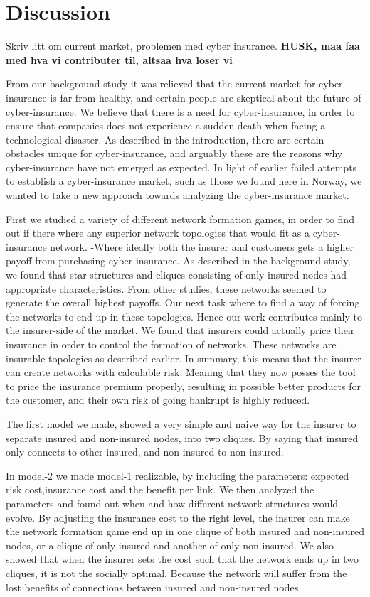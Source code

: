 
\chapter{Discussion}
Skriv litt om current market, problemen med cyber insurance.
\textbf{HUSK, maa faa med hva vi contributer til, altsaa hva loser vi}

From our background study it was relieved that the current market for cyber-insurance is far from healthy, and certain people are skeptical about the future of cyber-insurance. We believe that there is a need for cyber-insurance, in order to ensure that companies does not experience a sudden death when facing a technological disaster. As described in the introduction, there are certain obstacles unique for cyber-insurance, and arguably these are the reasons why cyber-insurance have not emerged as expected. In light of earlier failed attempts to establish a cyber-insurance market, such as those we found here in Norway, we wanted to take a new approach towards analyzing the cyber-insurance market. 

First we studied a variety of different network formation games, in order to find out if there where any superior network topologies that would fit as a cyber-insurance network. -Where ideally both the insurer and customers gets a higher payoff from purchasing cyber-insurance. As described in the background study, we found that star structures and cliques consisting of only insured nodes had appropriate characteristics.  From other studies, these networks seemed to generate the overall highest payoffs. Our next task where to find a way of forcing the networks to end up in these topologies. Hence our work contributes mainly to the insurer-side of the market. We found that insurers could actually price their insurance in order to control the formation of networks. These networks are insurable topologies as described earlier. In summary, this means that the insurer can create networks with calculable risk. Meaning that they now posses the tool to price the insurance premium properly, resulting in possible better products for the customer, and their own risk of going bankrupt is highly reduced.

The first model we made, showed a very simple and naive way for the insurer to separate insured and non-insured nodes, into two cliques. By saying that insured only connects to other insured, and non-insured to non-insured. 

 In model-2 we made model-1 realizable, by including the parameters: expected risk cost,insurance cost and the benefit per link. We then analyzed the parameters and found out when and how different network structures would evolve. By adjusting the insurance cost to the right level, the insurer can make the network formation game end up in one clique of both insured and non-insured nodes, or a clique of only insured and another of only non-insured. 
We also showed that when the insurer sets the cost such that the network ends up in two cliques, it is not the socially optimal. Because the network will suffer from the lost benefits of connections between insured and non-insured nodes. 

